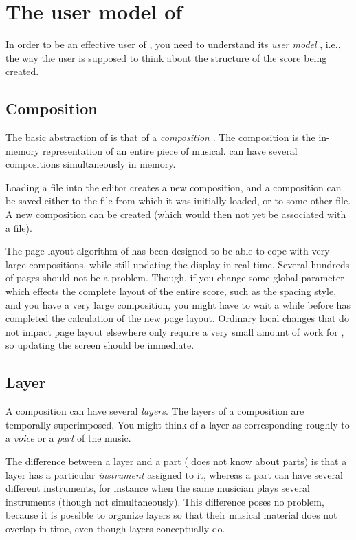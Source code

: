 \chapter{The user model of \sysname{}}
\label{chap-user-model}

In order to be an effective user of \sysname{}, you need to understand
its \emph{user model} , i.e., the way the user is
supposed to think about the structure of the score being created.

\section{Composition}
\label{sec-model-composition}

The basic abstraction of \sysname{} is that of a \emph{composition}
.  The composition is the in-memory representation
of an entire piece of musical.  \sysname{} can have several
compositions simultaneously in memory.

Loading a \sysname{} file into the editor creates a new composition,
and a composition can be saved either to the file from which it was
initially loaded, or to some other file.  A new composition can be
created (which would then not yet be associated with a file).

The page layout algorithm of \sysname{} has been designed to be able
to cope with very large compositions, while still updating the display
in real time.  Several hundreds of pages should not be a problem.
Though, if you change some global parameter which effects the complete
layout of the entire score, such as the spacing style, and you have a
very large composition, you might have to wait a while before
\sysname{} has completed the calculation of the new page layout.
Ordinary local changes that do not impact page layout elsewhere only
require a very small amount of work for \sysname{}, so updating the
screen should be immediate.

\section{Layer}

A composition can have several \emph{layers}.  The layers
of a composition are temporally superimposed.  You might think of a layer
as corresponding roughly to a \emph{voice}  or a
\emph{part}  of the music.

The difference between a layer and a part (\sysname{} does not know
about parts) is that a layer has a particular \emph{instrument}
 assigned to it, whereas a part can have several
different instruments, for instance when the same musician plays
several instruments (though not simultaneously).  This difference
poses no problem, because it is possible to organize \sysname{} layers
so that their musical material does not overlap in time, even though
layers conceptually do.

